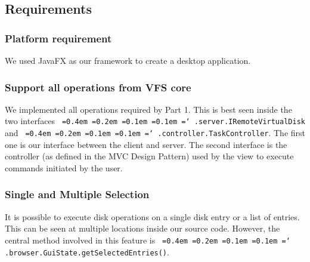 \documentclass[a4paper,12pt]{article}
\newcommand*\justify{%
  \fontdimen2\font=0.4em%
  \fontdimen3\font=0.2em%
  \fontdimen4\font=0.1em%
  \fontdimen7\font=0.1em%
  \hyphenchar\font=`\-%
}
\newcommand{\mono}[1]{\texttt{\justify #1}}
\begin{document}
\subsection{Requirements}
\subsubsection{Platform requirement}
We used JavaFX as our framework to create a desktop application.

\subsubsection{Support all operations from VFS core}
We implemented all operations required by Part 1. This is best seen inside the two interfaces \mono{.server.IRemoteVirtualDisk} and \mono{.controller.TaskController}. The first one is our interface between the client and server. The second interface is the controller (as defined in the MVC Design Pattern) used by the view to execute commands initiated by the user.

\subsubsection{Single and Multiple Selection}
It is possible to execute disk operations on a single disk entry or a list of entries. This can be seen at multiple locations inside our source code. However, the central method involved in this feature is \mono{.browser.GuiState.getSelectedEntries()}.
\end{document}
